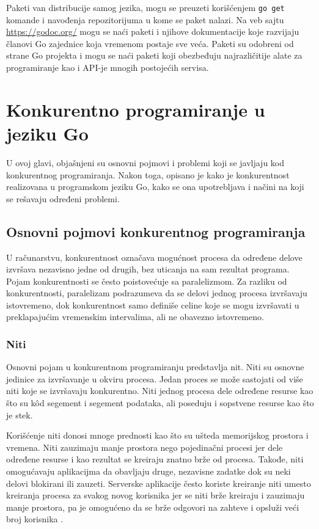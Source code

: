 \documentclass[12pt,oneside]{memoir}
\begin{document}
Paketi van distribucije samog jezika, mogu se preuzeti korišćenjem \texttt{go get} komande i navođenja repozitorijuma u kome se paket nalazi. Na veb sajtu \url{https://godoc.org/} mogu se naći paketi i njihove dokumentacije koje razvijaju članovi Go zajednice koja vremenom postaje sve veća. Paketi su odobreni od strane Go projekta i mogu se naći paketi koji obezbeđuju najrazličitije alate za programiranje kao i API-je mnogih postojećih servisa.


\chapter{Konkurentno programiranje u jeziku Go} \label{conc}

U ovoj glavi, objašnjeni su osnovni pojmovi i problemi koji se javljaju kod konkurentnog programiranja. Nakon toga, opisano je kako je konkurentnost realizovana u programskom jeziku Go, kako se ona upotrebljava i načini na koji se rešavaju određeni problemi. 

\section{Osnovni pojmovi konkurentnog programiranja}

U računarstvu, konkurentnost označava mogućnost procesa da određene delove izvršava nezavisno jedne od drugih, bez uticanja na sam rezultat programa. Pojam konkurentnosti se često poistovećuje sa paralelizmom. Za razliku od konkurentnosti, paralelizam podrazumeva da se delovi jednog procesa izvršavaju istovremeno, dok konkurentnost samo definiše celine koje se mogu izvršavati u preklapajućim vremenskim intervalima, ali ne obavezno istovremeno. 

\subsection{Niti}

Osnovni pojam u konkurentnom programiranju predstavlja nit. Niti su osnovne jedinice za izvršavanje u okviru procesa. Jedan proces se može sastojati od više niti koje se izvršavaju konkurentno. Niti jednog procesa dele određene resurse kao što su k\^{o}d segement i segement podataka, ali poseduju i sopstvene resurse kao što je stek. 

Korišćenje niti donosi mnoge prednosti kao što su ušteda memorijskog prostora i vremena. Niti zauzimaju manje prostora nego pojedinačni procesi jer dele određene resurse i kao rezultat se kreiraju znatno brže od procesa. Takođe, niti omogućavaju aplikacijma da obavljaju druge, nezavisne zadatke dok su neki delovi blokirani ili zauzeti. Serverske aplikacije često koriste kreiranje niti umesto kreiranja procesa za svakog novog korisnika jer se niti brže kreiraju i zauzimaju manje prostora, pa je omogućeno da se brže odgovori na zahteve i opsluži veći broj korisnika \cite{os}.  
\end{document}
